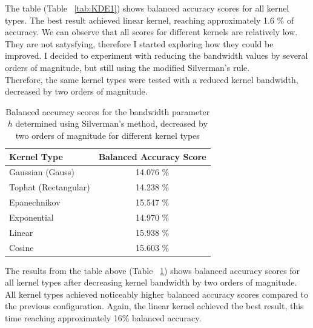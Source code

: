 \documentclass[runningheads]{llncs}
\begin{document}
The table (Table ~\ref{tab:KDE1}) shows balanced accuracy scores for all kernel types. The best result achieved linear kernel, reaching approximately 1.6 \% of accuracy. We can observe that all scores for different kernels are relatively low. They are not satysfying, therefore I started exploring how they could be improved. I decided to experiment with reducing the bandwidth values by several orders of magnitude, but still using the modified Silverman's rule.\\
Therefore, the same kernel types were tested with a reduced kernel bandwidth, decreased by two orders of magnitude.

\begin{table}[H]
    \centering
        \caption{Balanced accuracy scores for the bandwidth parameter \( h \) determined using Silverman's method, decreased by two orders of magnitude for different kernel types}
        \label{KDE2}
        \begin{tabular}{lc}
        \toprule
        \textbf{Kernel Type}        & \multicolumn{1}{l}{\textbf{Balanced Accuracy Score}} \\
        
        \midrule
        Gaussian (Gauss)            & 14.076 \%                                        \\
        Tophat (Rectangular)        & 14.238 \%                                        \\
        Epanechnikov                & 15.547 \%                                        \\
        Exponential                 & 14.970 \%                                        \\
        Linear                      & 15.938 \%                                        \\
        Cosine                      & 15.603 \%  \\ 
        \bottomrule
        \end{tabular}
\end{table}

The results from the table above (Table ~\ref{KDE2}) shows balanced accuracy scores for all kernel types after decreasing kernel bandwidth by two orders of magnitude.\\
All kernel types achieved noticeably higher balanced accuracy scores compared to the previous configuration. Again, the linear kernel achieved the best result, this time reaching approximately 16\% balanced accuracy.
\end{document}
